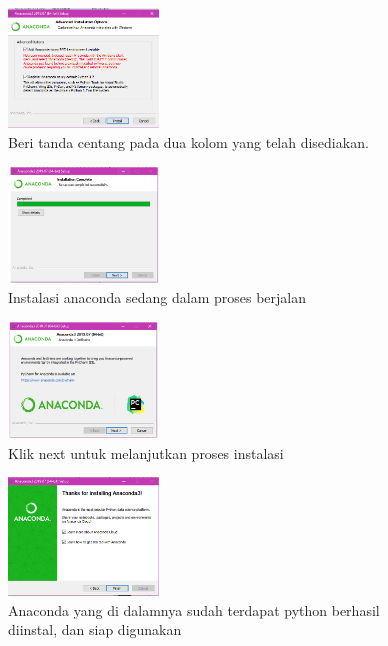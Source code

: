 	\begin{figure}[H]
		\includegraphics[width=4cm]{figures/1184065/addNew.PNG}
		\centering
		\caption{Beri tanda centang pada dua kolom yang telah disediakan. }
	\end{figure}
	\begin{figure}[H]
		\includegraphics[width=4cm]{figures/1184065/9.PNG}
		\centering
		\caption{Instalasi anaconda sedang dalam proses berjalan}
	\end{figure}
	\begin{figure}[H]
		\includegraphics[width=4cm]{figures/1184065/10.PNG}
		\centering
		\caption{Klik next untuk melanjutkan proses instalasi}
	\end{figure}
	\begin{figure}[H]
		\includegraphics[width=4cm]{figures/1184065/11.PNG}
		\centering
		\caption{Anaconda yang di dalamnya sudah terdapat python berhasil diinstal, dan siap digunakan}
	\end{figure}
